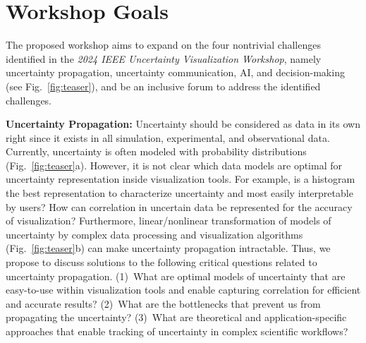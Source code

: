 \section{Workshop Goals}\label{sec:workshopGoals}

\vspace{-1mm} The proposed workshop aims to expand on the four nontrivial challenges identified in the {\em 2024 IEEE Uncertainty Visualization Workshop}, namely uncertainty propagation, uncertainty communication, AI, and decision-making (see Fig.~\ref{fig:teaser}), and be an inclusive forum to address the identified challenges. 



\textbf{Uncertainty Propagation:}
Uncertainty should be considered as data in its own right since it exists in all simulation, experimental, and observational data. Currently, uncertainty is often modeled with probability distributions (Fig.\ \ref{fig:teaser}a). However, it is not clear which data models are optimal for uncertainty representation inside visualization tools. For example, is a histogram the best representation to characterize uncertainty and most easily interpretable by users? How can correlation in uncertain data be represented for the accuracy of visualization? Furthermore, linear/nonlinear transformation of models of uncertainty by complex data processing and visualization algorithms (Fig.\ \ref{fig:teaser}b) can make uncertainty propagation intractable. Thus, we propose to discuss solutions to the following critical questions related to uncertainty propagation. (1)~What are optimal models of uncertainty that are easy-to-use within visualization tools and enable capturing correlation for efficient and accurate results? (2)~What are the bottlenecks that prevent us from propagating the uncertainty? (3)~What are theoretical and application-specific approaches that enable tracking of uncertainty in complex scientific workflows? 


